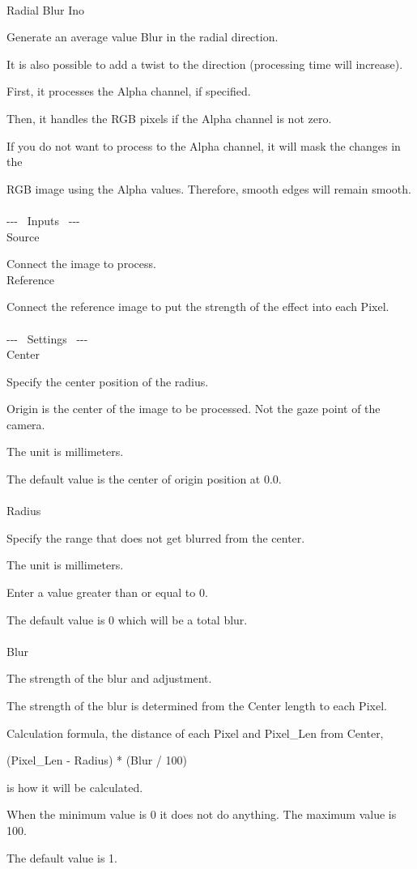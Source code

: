 \documentclass[a4paper,12pt]{article}
\begin{document}
\thispagestyle{empty}

\Large
\noindent \\
Radial Blur Ino\medskip
\par
\normalsize
Generate an average value Blur in the radial direction.\par
It is also possible to add a twist to the direction (processing time will increase).\\
\par
First, it processes the Alpha channel, if specified.\par
Then, it handles the RGB pixels if the Alpha channel is not zero.\par
If you do not want to process to the Alpha channel, it will mask the changes in the\par
RGB image using the Alpha values. Therefore, smooth edges will remain smooth.\\
\\
-{-}- \ Inputs \ -{-}-\\
Source\par
Connect the image to process.\\
Reference\par
Connect the reference image to put the strength of the effect into each Pixel.\\
\\
-{-}- \ Settings \ -{-}-\\
Center\par
Specify the center position of the radius.\par
Origin is the center of the image to be processed. Not the gaze point of the camera.\par
The unit is millimeters.\par
The default value is the center of origin position at  0.0\textquotedbl .\\
\\
Radius\par
Specify the range that does not get blurred from the center.\par
The unit is millimeters.\par
Enter a value greater than or equal to 0.\par
The default value is 0 which will be a total blur.\\
\\
Blur\par
The strength of the blur and adjustment.\par
The strength of the blur is determined from the Center length to each Pixel.\par
Calculation formula, the distance of each Pixel and Pixel\_Len from Center,\par
(Pixel\_Len - Radius) * (Blur / 100)\par
is how it will be calculated.\par
When the minimum value is 0 it does not do anything. The maximum value is 100.\par
The default value is 1.
\end{document}
